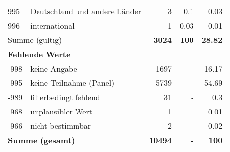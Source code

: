 \begin{longtable}{lXrrr}
        995 & \multicolumn{1}{X}{Deutschland und andere Länder} & %
          \num{3} &
          \num[round-mode=places,round-precision=2]{0.1} &
          \num[round-mode=places,round-precision=2]{0.03} \\

        996 & \multicolumn{1}{X}{international} & %
          \num{1} &
          \num[round-mode=places,round-precision=2]{0.03} &
          \num[round-mode=places,round-precision=2]{0.01} \\

     \midrule
     \multicolumn{2}{l}{Summe (gültig)} &
       \textbf{\num{3024}} &
     \textbf{\num{100}} &
       \textbf{\num[round-mode=places,round-precision=2]{28.82}} \\
     \multicolumn{5}{l}{\textbf{Fehlende Werte}}\\
       -998 &
       keine Angabe &
         \num{1697} &
        - &
         \num[round-mode=places,round-precision=2]{16.17} \\
       -995 &
       keine Teilnahme (Panel) &
         \num{5739} &
        - &
         \num[round-mode=places,round-precision=2]{54.69} \\
       -989 &
       filterbedingt fehlend &
         \num{31} &
        - &
         \num[round-mode=places,round-precision=2]{0.3} \\
       -968 &
       unplausibler Wert &
         \num{1} &
        - &
         \num[round-mode=places,round-precision=2]{0.01} \\
       -966 &
       nicht bestimmbar &
         \num{2} &
        - &
         \num[round-mode=places,round-precision=2]{0.02} \\
     \midrule
     \multicolumn{2}{l}{\textbf{Summe (gesamt)}} &
          \textbf{\num{10494}} &
        \textbf{-} &
        \textbf{\num{100}} \\
     \bottomrule
     \end{longtable}
     
